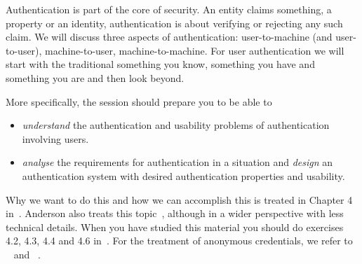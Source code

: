 Authentication is part of the core of security.
An entity claims something, a property or an identity, authentication is about 
verifying or rejecting any such claim.
We will discuss three aspects of authentication:
user-to-machine (and user-to-user),
machine-to-user,
machine-to-machine.
For user authentication we will start with the traditional something you know, 
something you have and something you are and then look beyond.

More specifically, the session should prepare you to be able to
\begin{itemize}
  \item \emph{understand} the authentication and usability problems of 
    authentication involving users.
  \item \emph{analyse} the requirements for authentication in a situation and 
    \emph{design} an authentication system with desired authentication 
    properties and usability.
\end{itemize}

Why we want to do this and how we can accomplish this is treated in Chapter 
4 in~\cite{Gollmann2011cs}.
Anderson also treats this topic~\cite[Chap.~2]{Anderson2008sea}, although in 
a wider perspective with less technical details.
When you have studied this material you should do exercises 4.2, 4.3, 4.4 and 
4.6 in~\cite{Gollmann2011cs}.
For the treatment of anonymous credentials, we refer to 
~\cite{AnonymousCredentials} and 
~\cite{AnonPass-magazine}.
